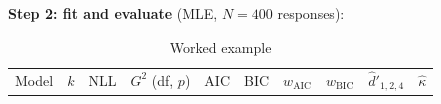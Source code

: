 \textbf{Step 2: fit and evaluate} (MLE, \(N = 400\) responses):

\begin{landscape}\small
\begin{longtable}[]{@{}
  >{\raggedright\arraybackslash}p{}
  >{\raggedright\arraybackslash}p{}
  >{\raggedright\arraybackslash}p{}
  >{\raggedright\arraybackslash}p{}
  >{\raggedright\arraybackslash}p{}
  >{\raggedright\arraybackslash}p{}
  >{\raggedright\arraybackslash}p{}
  >{\raggedright\arraybackslash}p{}
  >{\raggedright\arraybackslash}p{}
  >{\raggedright\arraybackslash}p{}@{}}
\caption{\centering Worked example}\tabularnewline
\toprule\noalign{}
\begin{minipage}[b]{\linewidth}\raggedright
Model
\end{minipage} & \begin{minipage}[b]{\linewidth}\raggedright
\(k\)
\end{minipage} & \begin{minipage}[b]{\linewidth}\raggedright
NLL
\end{minipage} & \begin{minipage}[b]{\linewidth}\raggedright
\(G^2\) (df, \(p\))
\end{minipage} & \begin{minipage}[b]{\linewidth}\raggedright
AIC
\end{minipage} & \begin{minipage}[b]{\linewidth}\raggedright
BIC
\end{minipage} & \begin{minipage}[b]{\linewidth}\raggedright
\(w_{\text{AIC}}\)
\end{minipage} & \begin{minipage}[b]{\linewidth}\raggedright
\(w_{\text{BIC}}\)
\end{minipage} & \begin{minipage}[b]{\linewidth}\raggedright
\(\hat d'_{1,2,4}\)
\end{minipage} & \begin{minipage}[b]{\linewidth}\raggedright
\(\hat\kappa\)
\end{minipage} \\

\end{longtable}
\end{landscape}
